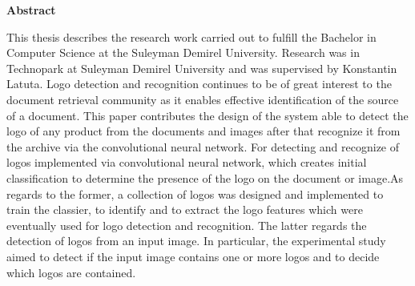 \newpage
\pagestyle{plain}

\begin{center}
    \Large
    \textbf{Abstract}
\end{center}

This thesis describes the research work carried out to fulfill the Bachelor in Computer Science at the Suleyman Demirel University. Research was in Technopark at Suleyman Demirel University and was supervised by Konstantin Latuta. 
Logo detection and recognition continues to be of great interest to the document retrieval community as it enables effective identification of the source of a document. This paper contributes the design of the system able to detect the logo of any product from the documents and images after that recognize it from the archive via the convolutional neural network. For detecting and recognize of logos implemented via convolutional neural network, which creates initial classification to determine the presence of the logo on the document or image.As regards to the former, a collection of logos was designed and implemented to train the classier, to identify and to extract the logo features which were eventually used for logo detection and recognition. The latter regards the detection of logos from an input image. In particular, the experimental study aimed to detect if the input image contains one or more logos and to decide which logos are contained.